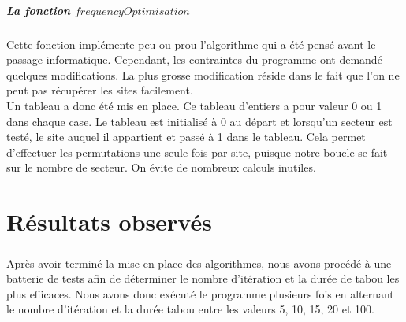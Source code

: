\documentclass[a4paper, 11pt]{report}
\begin{document}
			\paragraph{La fonction $frequencyOptimisation$\\}
			
			Cette fonction implémente peu ou prou l'algorithme qui a été pensé avant le passage informatique. Cependant, les contraintes du programme ont demandé quelques modifications. La plus grosse modification réside dans le fait que l'on ne peut pas récupérer les sites facilement. \\
			Un tableau a donc été mis en place. Ce tableau d'entiers a pour valeur 0 ou 1 dans chaque case. Le tableau est initialisé à 0 au départ et lorsqu'un secteur est testé, le site auquel il appartient et passé à 1 dans le tableau. Cela permet d'effectuer les permutations une seule fois par site, puisque notre boucle se fait sur le nombre de secteur. On évite de nombreux calculs inutiles.
	
	
	

\chapter{Résultats observés}

    \paragraph{}Après avoir terminé la mise en place des algorithmes, nous avons procédé à une
    batterie de tests afin de déterminer le nombre d'itération et la durée de tabou les plus
    efficaces. Nous avons donc exécuté le programme plusieurs fois en alternant le nombre
    d'itération et la durée tabou entre les valeurs 5, 10, 15, 20 et 100.
\end{document}
